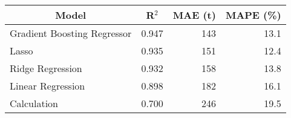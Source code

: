 
\begin{tabular}[t]{lrrr}
\toprule
\multicolumn{1}{c}{Model} & \multicolumn{1}{c}{R$^2$} & \multicolumn{1}{c}{MAE (t)} & \multicolumn{1}{c}{MAPE (\%)}\\
\midrule
Gradient Boosting Regressor & 0.947 & 143 & 13.1\\
Lasso & 0.935 & 151 & 12.4\\
Ridge Regression & 0.932 & 158 & 13.8\\
Linear Regression & 0.898 & 182 & 16.1\\
Calculation & 0.700 & 246 & 19.5\\
\bottomrule
\end{tabular}
